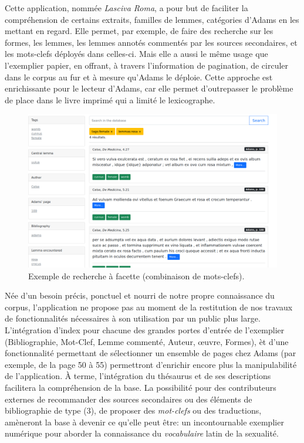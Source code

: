 Cette application, nommée \textit{Lasciva Roma}, a pour but de faciliter la compréhension de certains extraits, familles de lemmes, catégories d'Adams en les mettant en regard. Elle permet, par exemple, de faire des recherche sur les formes, les lemmes, les lemmes annotés commentés par les sources secondaires, et les mots-clefs déployés dans celles-ci. Mais elle a aussi le même usage que l'exemplier papier, en offrant, à travers l'information de pagination, de circuler dans le corpus au fur et à mesure qu'Adams le déploie. Cette approche est enrichissante pour le lecteur d'Adams, car elle permet d'outrepasser le problème de place dans le livre imprimé qui a limité le lexicographe.

\begin{figure}
    \centering
    \includegraphics[width=.8\linewidth]{figures/chap1/part3/exemplier/RechercheFacette.png}
    \caption{Exemple de recherche à facette (combinaison de mots-clefs).}
    \label{fig:exemplier:recherche}
\end{figure}

Née d'un besoin précis, ponctuel et nourri de notre propre connaissance du corpus, l'application ne propose pas au moment de la restitution de nos travaux de fonctionnalités nécessaires à son utilisation par un public plus large. L'intégration d'index pour chacune des grandes portes d'entrée de l'exemplier (Bibliographie, Mot-Clef, Lemme commenté, Auteur, œuvre, Formes), èt d'une fonctionnalité permettant de sélectionner un ensemble de pages chez Adams (par exemple, de la page 50 à 55) permettront d'enrichir encore plus la manipulabilité de l'application. À terme, l'intégration du thésaurus et de ses descriptions facilitera la compréhension de la base. La possibilité pour des contributeurs externes de recommander des sources secondaires ou des éléments de bibliographie de type (3), de proposer des \textit{mot-clefs} ou des traductions, amèneront la base à devenir ce qu'elle peut être: un incontournable exemplier numérique pour aborder la connaissance du \textit{vocabulaire} latin de la sexualité.

